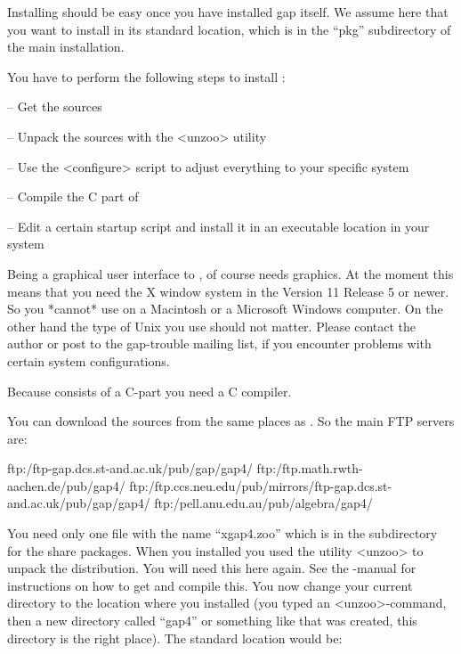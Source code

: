 
Installing {\XGAP} should be easy once you have installed gap itself. We
assume here that you want to install {\XGAP} in its standard location,
which is in the ``pkg'' subdirectory of the main {} installation.


You have to perform the following steps to install {\XGAP}:

\beginlist
\item{--} Get the sources
\item{--} Unpack the sources with the <unzoo> utility
\item{--} Use the <configure> script to adjust everything to your specific
  system
\item{--} Compile the C part of {\XGAP}
\item{--} Edit a certain startup script and install it in an executable
      location in your system
\endlist


Being a graphical user interface to {\GAP}, {\XGAP} of course needs
graphics. At the moment this means that you need the X window system in the 
Version 11 Release 5 or newer. So you *cannot* use {\XGAP} on a Macintosh
or a Microsoft Windows computer. On the other hand the type of Unix you use 
should not matter. Please contact the author or post to the gap-trouble
mailing list, if you encounter problems with certain system configurations.

Because {\XGAP} consists of a C-part you need a C compiler.


You can download the sources from the same places as {\GAP}. So the main
FTP servers are:

\begintt
ftp:/ftp-gap.dcs.st-and.ac.uk/pub/gap/gap4/
ftp:/ftp.math.rwth-aachen.de/pub/gap4/
ftp:/ftp.ccs.neu.edu/pub/mirrors/ftp-gap.dcs.st-and.ac.uk/pub/gap/gap4/
ftp:/pell.anu.edu.au/pub/algebra/gap4/
\endtt

You need only one file with the name ``xgap4.zoo''
which is in the subdirectory for the share packages.
When you installed {\GAP} you used the utility <unzoo> to unpack the
distribution. You will need this here again. See the {\GAP}-manual for
instructions on how to get and compile this.
You now change your current directory to the location where you installed
{\GAP} (you typed an <unzoo>-command, then a new directory called
``gap4'' or something like that was created, this directory is the right
place). The standard location would be:

